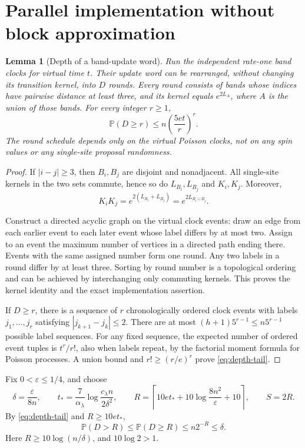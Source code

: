 \documentclass[11pt,reqno]{amsart}
\newtheorem{lemma}[theorem]{Lemma}
\theoremstyle{remark}
\newcommand{\Prob}{\mathbb P}
\numberwithin{equation}{section}
\begin{document}
\section{Parallel implementation without block approximation}

\begin{lemma}[Depth of a band-update word]\label{lem:parallel}
Run the independent rate-one band clocks for virtual time $t$. Their update word can be rearranged, without changing its transition kernel, into $D$ rounds. Every round consists of bands whose indices have pairwise distance at least three, and its kernel equals $e^{2L_A}$, where $A$ is the union of those bands. For every integer $r\ge1$,
\begin{equation}\label{eq:depth-tail}
 \Prob(D\ge r)\le n\left(\frac{5et}{r}\right)^r.
\end{equation}
The round schedule depends only on the virtual Poisson clocks, not on any spin values or any single-site proposal randomness.
\end{lemma}

\begin{proof}
If $|i-j|\ge3$, then $B_i,B_j$ are disjoint and nonadjacent. All single-site kernels in the two sets commute, hence so do $L_{B_i},L_{B_j}$ and $K_i,K_j$. Moreover,
\[
 K_iK_j=e^{2(L_{B_i}+L_{B_j})}=e^{2L_{B_i\cup B_j}}.
\]

Construct a directed acyclic graph on the virtual clock events: draw an edge from each earlier event to each later event whose label differs by at most two. Assign to an event the maximum number of vertices in a directed path ending there. Events with the same assigned number form one round. Any two labels in a round differ by at least three. Sorting by round number is a topological ordering and can be achieved by interchanging only commuting kernels. This proves the kernel identity and the exact implementation assertion.

If $D\ge r$, there is a sequence of $r$ chronologically ordered clock events with labels $j_1,\ldots,j_r$ satisfying $|j_{k+1}-j_k|\le2$. There are at most $(h+1)5^{r-1}\le n5^{r-1}$ possible label sequences. For any fixed sequence, the expected number of ordered event tuples is $t^r/r!$, also when labels repeat, by the factorial moment formula for Poisson processes. A union bound and $r!\ge(r/e)^r$ prove \eqref{eq:depth-tail}.
\end{proof}

Fix $0<\varepsilon\le1/4$, and choose
\begin{equation}\label{eq:parameters}
 \delta=\frac{\varepsilon}{8n},\qquad
 t_* =\frac7{\alpha_\lambda}\log\frac{c_\lambda n}{2\delta^2},\qquad
 R=\left\lceil10et_*+10\log\frac{8n^2}{\varepsilon}+10\right\rceil,
 \qquad S=2R.
\end{equation}
By \eqref{eq:depth-tail} and $R\ge10et_*$,
\[
 \Prob(D>R)\le\Prob(D\ge R)\le n2^{-R}\le\delta.
\]
Here $R\ge10\log(n/\delta)$, and $10\log2>1$.
\end{document}
